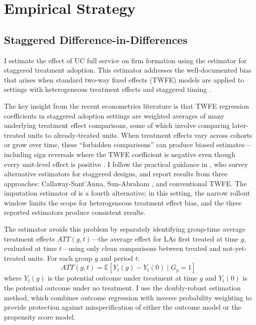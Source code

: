\documentclass[12pt]{article}
\newcommand{\E}{\mathbb{E}}
\begin{document}
\section{Empirical Strategy}
\label{sec:empirical}

\subsection{Staggered Difference-in-Differences}

I estimate the effect of UC full service on firm formation using the \citet{callaway2021difference} estimator for staggered treatment adoption. This estimator addresses the well-documented bias that arises when standard two-way fixed effects (TWFE) models are applied to settings with heterogeneous treatment effects and staggered timing \citep{goodman2021difference, dechaisemartin2020two, sun2021estimating}.

The key insight from the recent econometrics literature is that TWFE regression coefficients in staggered adoption settings are weighted averages of many underlying treatment effect comparisons, some of which involve comparing later-treated units to already-treated units. When treatment effects vary across cohorts or grow over time, these ``forbidden comparisons'' can produce biased estimates---including sign reversals where the TWFE coefficient is negative even though every unit-level effect is positive \citep{goodman2021difference}. I follow the practical guidance in \citet{roth2023s}, who survey alternative estimators for staggered designs, and report results from three approaches: Callaway-Sant'Anna, Sun-Abraham \citep{sun2021estimating}, and conventional TWFE. The imputation estimator of \citet{borusyak2024revisiting} is a fourth alternative; in this setting, the narrow rollout window limits the scope for heterogeneous treatment effect bias, and the three reported estimators produce consistent results.

The \citet{callaway2021difference} estimator avoids this problem by separately identifying group-time average treatment effects $ATT(g,t)$---the average effect for LAs first treated at time $g$, evaluated at time $t$---using only clean comparisons between treated and not-yet-treated units. For each group $g$ and period $t$:
\begin{equation}
ATT(g,t) = \E[Y_t(g) - Y_t(0) \mid G_g = 1]
\end{equation}
where $Y_t(g)$ is the potential outcome under treatment at time $g$ and $Y_t(0)$ is the potential outcome under no treatment. I use the doubly-robust estimation method, which combines outcome regression with inverse probability weighting to provide protection against misspecification of either the outcome model or the propensity score model.
\end{document}
